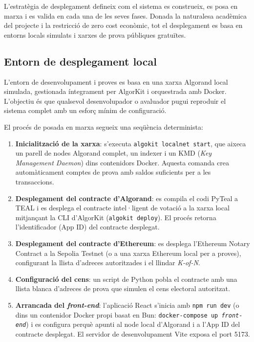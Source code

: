 L'estratègia de desplegament defineix com el sistema es construeix, es posa en marxa i es valida en cada una de les seves fases. Donada la naturalesa acadèmica del projecte i la restricció de zero cost econòmic, tot el desplegament es basa en entorns locals simulats i xarxes de prova públiques gratuïtes.
 
\subsection{Entorn de desplegament local}
 
L'entorn de desenvolupament i proves es basa en una xarxa Algorand local simulada, gestionada íntegrament per AlgorKit i orquestrada amb Docker. L'objectiu és que qualsevol desenvolupador o avaluador pugui reproduir el sistema complet amb un esforç mínim de configuració.
 
El procés de posada en marxa segueix una seqüència determinista:
 
\begin{enumerate}[label=\roman*.]
    \item \textbf{Inicialització de la xarxa}: s'executa \texttt{algokit localnet start}, que aixeca un parell de nodes Algorand complet, un indexer i un KMD (\textit{Key Management Daemon}) dins contenidors Docker. Aquesta comanda crea automàticament comptes de prova amb saldos suficients per a les transaccions.
    \item \textbf{Desplegament del contracte d'Algorand}: es compila el codi PyTeal a TEAL i es desplega el contracte intel·ligent de votació a la xarxa local mitjançant la CLI d'AlgorKit (\texttt{algokit deploy}). El procés retorna l'identificador (App ID) del contracte desplegat.
    \item \textbf{Desplegament del contracte d'Ethereum}: es desplega l'Ethereum Notary Contract a la Sepolia Testnet (o a una xarxa Ethereum local per a proves), configurant la llista d'adreces autoritzades i el llindar \textit{K-of-N}.
    \item \textbf{Configuració del cens}: un script de Python pobla el contracte amb una llista blanca d'adreces de prova que simulen el cens electoral autoritzat.
    \item \textbf{Arrancada del \textit{front-end}}: l'aplicació React s'inicia amb \texttt{npm run dev} (o dins un contenidor Docker propi basat en Bun: \texttt{docker-compose up \textit{front-end}}) i es configura perquè apunti al node local d'Algorand i a l'App ID del contracte desplegat. El servidor de desenvolupament Vite exposa el port 5173.

\end{enumerate}
 

